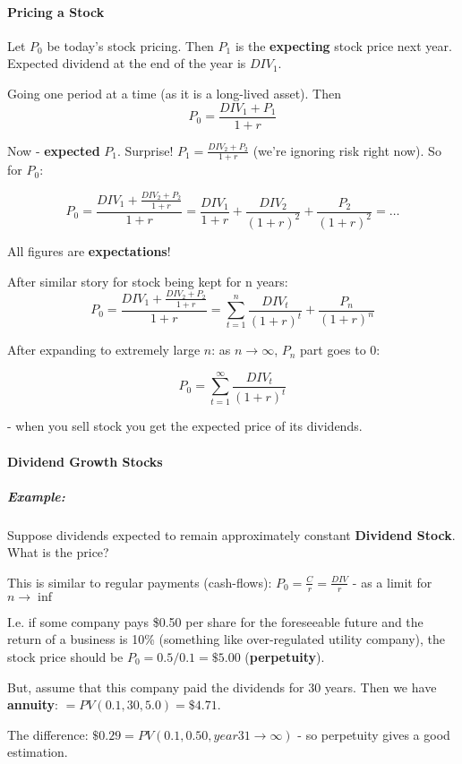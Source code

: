 \documentclass{scrartcl}
\newcommand{\example}{\subparagraph{Example:}} %
\begin{document}
\paragraph{Pricing a Stock}

Let $P_0$ be today's stock pricing. Then $P_1$ is the {\bf expecting} stock
price next year. Expected dividend at the end of the year is $DIV_1$.

Going one period at a time (as it is a long-lived asset). Then
$$P_0 = \frac{DIV_1 + P_1}{1+r} $$

Now - {\bf expected} $P_1$. Surprise! $P_1 = \frac{DIV_2 + P_2}{1+r}$ (we're
ignoring risk right now). So for $P_0$:

$$P_0 = \frac{DIV_1 + \frac{DIV_2 + P_2}{1+r}}{1+r} = \frac{DIV_1}{1+r} +
\frac{DIV_2}{(1+r)^2}+\frac{P_2}{(1+r)^2}=\dots$$

All figures are {\bf expectations}!

After similar story for stock being kept for n years:
$$P_0 = \frac{DIV_1 + \frac{DIV_2 + P_2}{1+r}}{1+r} = \sum \limits_{t=1}^n
\frac{DIV_t}{(1+r)^t} + \frac{P_n}{(1+r)^n}$$

After expanding to extremely large $n$: as $n \to \infty$, $P_n$ part goes to 0:

$$P_0 = \sum_{t=1}^\infty \frac{DIV_t}{(1+r)^t}$$

- when you sell stock you get the expected price of its dividends.


\paragraph{Dividend Growth Stocks}

\example Suppose dividends expected to remain approximately constant {\bf
  Dividend Stock}. What is the price?

This is similar to regular payments (cash-flows): $P_0 = \frac{C}r =
\frac{DIV}{r}$ - as a limit for $n \to \inf$

I.e. if some company pays \$0.50 per share for the foreseeable future and the
return of a business is 10\% (something like over-regulated utility company),
the stock price should be $P_0 = 0.5 / 0.1 = \$5.00$ ({\bf perpetuity}).

But, assume that this company paid the dividends for 30 years. Then we have {\bf
  annuity}: $=PV(0.1, 30, 5.0) = \$4.71$.

The difference: $\$0.29 = PV(0.1, 0.50, year 31 \to \infty)$ - so perpetuity
gives a good estimation.
\end{document}
